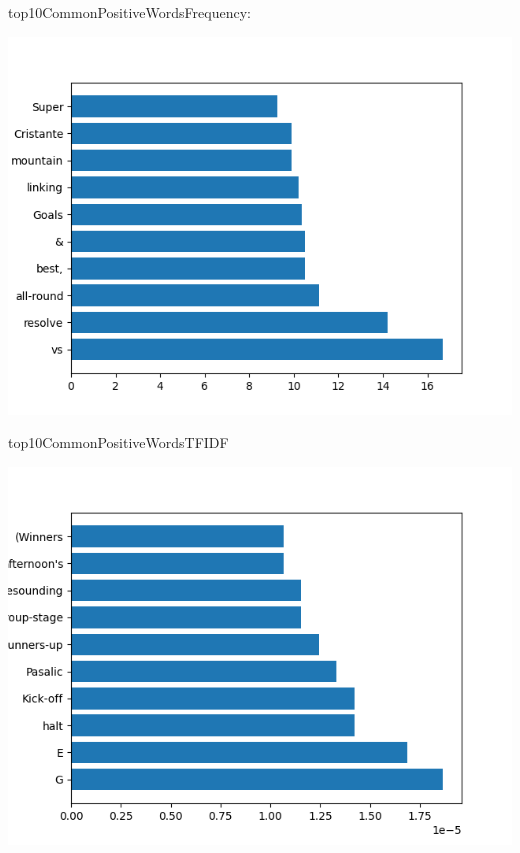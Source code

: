 \documentclass{article}
\begin{document}
top10CommonPositiveWordsFrequency:
\begin{center}
    \includegraphics{top10CommonPositiveWordsFrequency}
\end{center}

top10CommonPositiveWordsTFIDF
\begin{center}
    \includegraphics{top10CommonPositiveWordsTFIDF}
\end{center}
\end{document}
